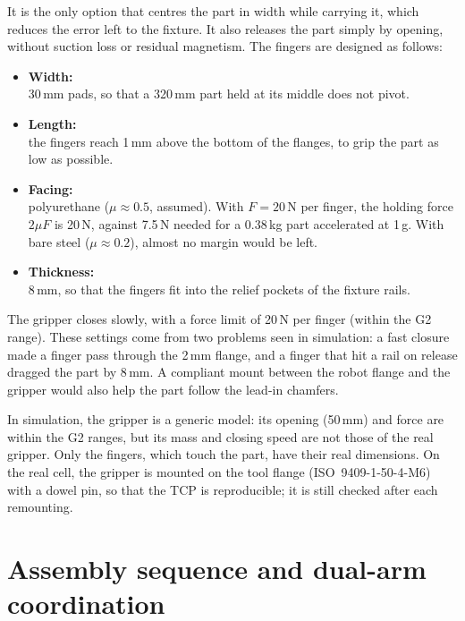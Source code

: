 \documentclass[11pt,a4paper]{article}
\begin{document}
It is the only option that centres the part in width while carrying it, which reduces the error
left to the fixture. It also releases the part simply by opening, without suction loss or
residual magnetism. The fingers are designed as follows:
\begin{itemize}
  \item \textbf{Width:}\\ 30\,mm pads, so that a 320\,mm part held at its middle does not pivot.
  \item \textbf{Length:}\\ the fingers reach 1\,mm above the bottom of the flanges, to grip the
        part as low as possible.
  \item \textbf{Facing:}\\ polyurethane ($\mu\approx0.5$, assumed). With $F=20$\,N per finger, the
        holding force $2\mu F$ is 20\,N, against 7.5\,N needed for a 0.38\,kg part accelerated at
        1\,g. With bare steel ($\mu\approx0.2$), almost no margin would be left.
  \item \textbf{Thickness:}\\ 8\,mm, so that the fingers fit into the relief pockets of the fixture
        rails.
\end{itemize}

The gripper closes slowly, with a force limit of 20\,N per finger (within the G2 range). These
settings come from two problems seen in simulation: a fast closure made a finger pass through the
2\,mm flange, and a finger that hit a rail on release dragged the part by 8\,mm. A compliant mount
between the robot flange and the gripper would also help the part follow the lead-in chamfers.

In simulation, the gripper is a generic model: its opening (50\,mm) and force are within the G2
ranges, but its mass and closing speed are not those of the real gripper. Only the fingers, which
touch the part, have their real dimensions. On the real cell, the gripper is mounted on the tool
flange (ISO~9409-1-50-4-M6) with a dowel pin, so that the TCP is reproducible; it is still checked
after each remounting.

\section{Assembly sequence and dual-arm coordination}
\label{sec:coord}
\end{document}
